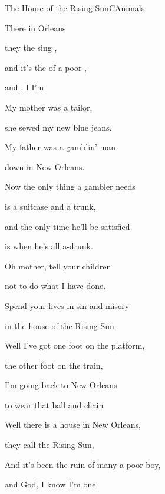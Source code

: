 \begin{song}{The House of the Rising Sun}{C}{Animals}


\begin{SBVerse}

There  in  Orleans

they  the sing ,

and it's  the  of  a poor ,

and , I  I'm 

\end{SBVerse}

\begin{SBVerse}

My mother was a tailor,

she sewed my new blue jeans.

My father was a gamblin' man

down in New Orleans.

\end{SBVerse}

\begin{SBVerse}

Now the only thing a gambler needs

is a suitcase and a trunk,

and the only time he'll be satisfied

is when he's all a-drunk.

\end{SBVerse}

\begin{SBVerse}

Oh mother, tell your children

not to do what I have done.

Spend your lives in sin and misery

in the house of the Rising Sun

\end{SBVerse}

\begin{SBVerse}

Well I've got one foot on the platform,

the other foot on the train,

I'm going back to New Orleans

to wear that ball and chain

\end{SBVerse}

\begin{SBVerse}

Well there is a house in New Orleans,

they call the Rising Sun,

And it's been the ruin of many a poor boy,

and God, I know I'm one.

\end{SBVerse}

\end{song}

\clearpage

